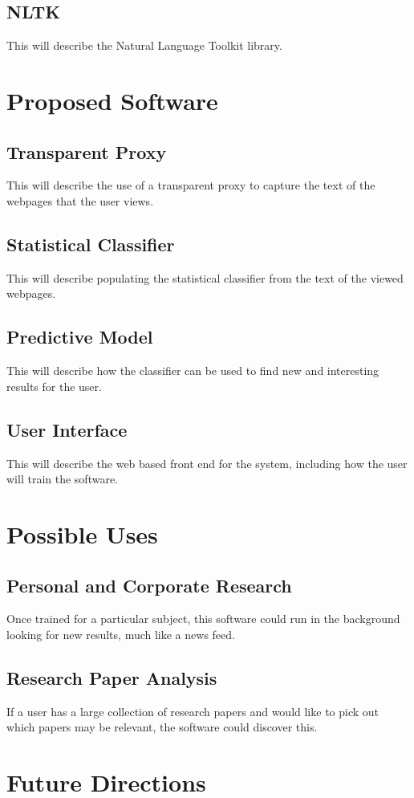 \documentclass[12pt]{article}
\begin{document}
\subsection{NLTK}
This will describe the Natural Language Toolkit library. \cite{NLTK:2013:Online}
\section{Proposed Software}
\subsection{Transparent Proxy}
This will describe the use of a transparent proxy to capture the text
of the webpages that the user views.
\subsection{Statistical Classifier}
This will describe populating the statistical classifier from the text
of the viewed webpages.
\subsection{Predictive Model}
This will describe how the classifier can be used to find new and
interesting results for the user.
\subsection{User Interface}
This will describe the web based front end for the system, including
how the user will train the software.
\section{Possible Uses}
\subsection{Personal and Corporate Research}
Once trained for a particular subject, this software could run in the
background looking for new results, much like a news feed.
\subsection{Research Paper Analysis}
If a user has a large collection of research papers and would like to
pick out which papers may be relevant, the software could discover this.
\section{Future Directions}
\end{document}
